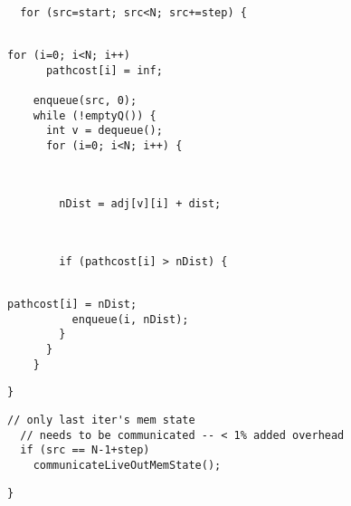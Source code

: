 \begin{lstlisting}[morekeywords={pathcost}, aboveskip=0pt,
belowskip=0pt, firstnumber=25,name=dij_checks,showlines=true]

  for (src=start; src<N; src+=step) {


\end{lstlisting}
\begin{lstlisting}[morekeywords={pathcost,dist}, aboveskip=0pt,
belowskip=0pt, firstnumber=28,name=dij_checks,showlines=true]
    for (i=0; i<N; i++)
      pathcost[i] = inf;

    enqueue(src, 0);
    while (!emptyQ()) {
      int v = dequeue();
      for (i=0; i<N; i++) {
\end{lstlisting}
\begin{lstlisting}[morekeywords={pathcost,dist}, aboveskip=0pt,
belowskip=0pt, firstnumber=auto,name=dij_checks,showlines=true]


        nDist = adj[v][i] + dist;
\end{lstlisting}
\begin{lstlisting}[morekeywords={pathcost}, aboveskip=0pt,
belowskip=0pt, firstnumber=auto,name=dij_checks,showlines=true]


        if (pathcost[i] > nDist) {


\end{lstlisting}
\begin{lstlisting}[morekeywords={pathcost}, aboveskip=0pt,
belowskip=0pt, firstnumber=auto,name=dij_checks]
          pathcost[i] = nDist;
          enqueue(i, nDist);
        }
      }
    }
\end{lstlisting}

\begin{lstlisting}[morekeywords={pathcost,dist}, aboveskip=0pt,
belowskip=0pt, firstnumber=auto,name=dij_checks,showlines=true]
  }

\end{lstlisting}

\begin{lstlisting}[morekeywords={pathcost},
aboveskip=0pt,belowskip=0pt,backgroundcolor=\color{lightgray},
firstnumber=auto, name=dij_checks,showlines=true]
  // only last iter's mem state
  // needs to be communicated -- < 1% added overhead
  if (src == N-1+step)
    communicateLiveOutMemState();
\end{lstlisting}

\begin{lstlisting}[morekeywords={pathcost}, aboveskip=0pt,
belowskip=0pt, firstnumber=auto,name=dij_checks]
}
\end{lstlisting}
